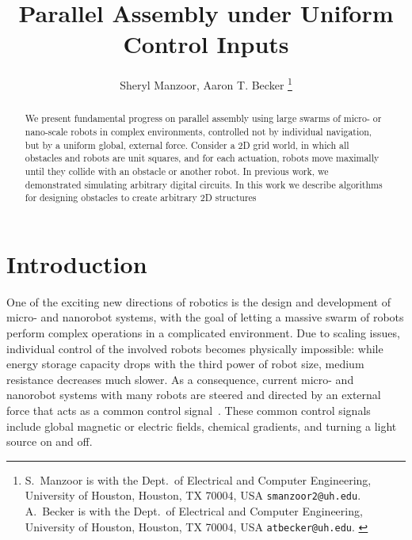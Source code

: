 \documentclass[letterpaper, 10 pt, conference]{ieeeconf}
\begin{document}

\title{\LARGE \bf 
Parallel Assembly under Uniform Control Inputs 
}
\author{
Sheryl Manzoor,
Aaron T. Becker
\thanks{{
S.~Manzoor is with the  Dept.~of Electrical and Computer Engineering,  University of Houston, Houston, TX 70004, USA {\tt\small smanzoor2@uh.edu}.
A.~Becker is with the  Dept.~of Electrical and Computer Engineering,  University of Houston, Houston, TX 70004, USA {\tt\small atbecker@uh.edu}.
}
} %
} %
\maketitle



\begin{abstract} 
We present fundamental progress on parallel assembly using large swarms of micro- or nano-scale robots
in complex environments, controlled not by individual navigation, but by a uniform global, external force.
Consider a 2D grid world, in which all obstacles and robots are unit squares,
and for each actuation, robots move maximally until they collide with an
obstacle or another robot. In previous work, we demonstrated simulating  arbitrary digital circuits. In this work we describe algorithms for designing obstacles to create arbitrary 2D structures

\end{abstract}

\section{Introduction}\label{sec:Intro}

One of the exciting new directions of robotics is the design and development
of micro- and nanorobot systems, with the goal of letting a massive swarm of robots
perform complex operations in a complicated environment. Due to scaling 
issues, individual control of the involved robots becomes physically impossible:
while energy storage capacity drops with the third power of robot size,
medium resistance decreases much slower. As a consequence,
current micro- and nanorobot systems with many robots are steered and
directed by an external force that acts as a common control signal~\cite{Donald2013,Chiang2011,Hsi-Wen2012,Diller2013,Jing2013,Ou2013,Lanauze2013}.
These common control signals include global magnetic or electric fields,
chemical gradients, and turning a light source on and off.  
\end{document}
